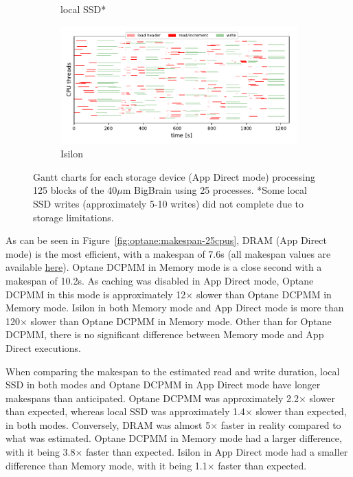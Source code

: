 \begin{figure}
\begin{subfigure}{0.5\textwidth}
    \caption{local SSD*}
\end{subfigure}
\begin{subfigure}{0.5\textwidth}
        \centering
    \includegraphics[width=\columnwidth]{figures/optane/gantt-1572388118-isilonAD_1it_25cpus_40bb-2.pdf}
    \caption{Isilon}\label{fig:optane:gantt25isilon}
\end{subfigure}
    \captionsetup{belowskip=-10pt}
    \caption{Gantt charts for each storage device (App Direct mode) processing
    125 blocks of the 40$\mu$m BigBrain using 25 processes. *Some local SSD
    writes (approximately 5-10 writes) did not complete due to storage
    limitations.}\label{fig:optane:gantt25}
\end{figure}

As can be seen in Figure~\ref{fig:optane:makespan-25cpus}, DRAM (App Direct mode) is
the most efficient, with a makespan of 7.6s (all makespan values are available
\href{https://github.com/big-data-lab-team/paper-memory-storage/blob/master/experiments/bigbrain-incrementation/results/makespan.csv}{here}).
Optane DCPMM in Memory mode is a close second with a makespan of 10.2s. As
caching was disabled in App Direct mode, Optane DCPMM in this mode is
approximately 12$\times$ slower than Optane DCPMM in Memory mode. Isilon in both Memory
mode and App Direct mode is more than 120$\times$ slower than Optane DCPMM in Memory
mode. Other than for Optane DCPMM, there is no significant difference between
Memory mode and App Direct executions.

When comparing the makespan to the estimated read and write duration, local SSD
in both modes and Optane DCPMM in App Direct mode have longer makespans than
anticipated. Optane DCPMM was approximately 2.2$\times$ slower than expected, whereas
local SSD was approximately 1.4$\times$ slower than expected, in both modes.
Conversely, DRAM was almost 5$\times$ faster in reality compared to what was estimated.
Optane DCPMM in Memory mode had a larger difference, with it being 3.8$\times$ faster
than expected. Isilon in App Direct mode had a smaller difference than Memory
mode, with it being 1.1$\times$ faster than expected.


